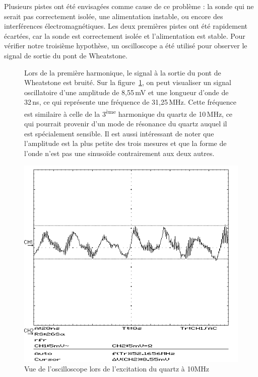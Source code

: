 Plusieurs pistes ont été envisagées comme cause de ce problème : la sonde qui ne serait pas correctement isolée, une alimentation instable, ou encore des interférences électromagnétiques.
Les deux premières pistes ont été rapidement écartées, car la sonde est correctement isolée et l'alimentation est stable.
Pour vérifier notre troisième hypothèse, un oscilloscope a été utilisé pour observer le signal de sortie du pont de Wheatstone.

\begin{figure}[H]
    \centering
    \begin{minipage}{0.48\textwidth}
        \small
        Lors de la première harmonique, le signal à la sortie du pont de Wheatstone est bruité. 
        Sur la figure~\ref{fig:10mhzbruit}, on peut visualiser un signal oscillatoire d'une amplitude de 8,55\,mV et une longueur d'onde de 32\,ns, ce qui représente une fréquence de 31,25\,MHz.
        Cette fréquence est similaire à celle de la 3\textsuperscript{ème} harmonique du quartz de 10\,MHz, ce qui pourrait provenir d'un mode de résonance du quartz auquel il est spécialement sensible.
        Il est aussi intéressant de noter que l'amplitude est la plus petite des trois mesures et que la forme de l'onde n'est pas une sinusoïde contrairement aux deux autres.
    \end{minipage}\hfill
    \begin{minipage}{0.48\textwidth}
        \centering
        \includegraphics[width=\textwidth]{assets/figures/SCR00006.png}
        \caption{Vue de l'oscilloscope lors de l'excitation du quartz à 10MHz}
        \label{fig:10mhzbruit}
    \end{minipage}
\end{figure}

